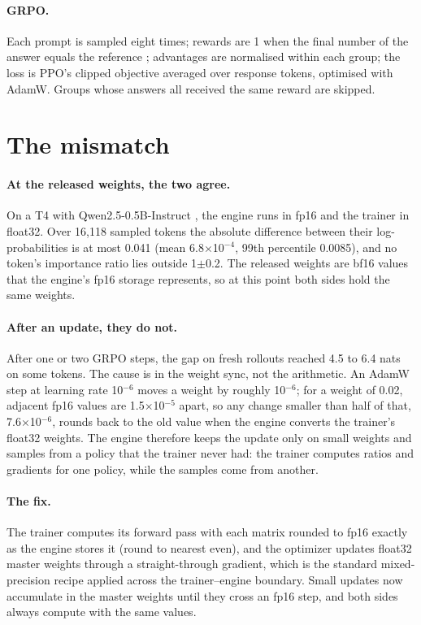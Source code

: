 \documentclass[11pt]{article}
\begin{document}
\paragraph{GRPO.} Each prompt is sampled eight times; rewards are 1 when the final number of the
answer equals the reference \citep{cobbe2021gsm8k}; advantages are normalised within each group;
the loss is PPO's clipped objective averaged over response tokens, optimised with AdamW. Groups
whose answers all received the same reward are skipped.

\section{The mismatch}
\label{sec:mismatch}

\paragraph{At the released weights, the two agree.} On a T4 with Qwen2.5-0.5B-Instruct
\citep{qwen2025qwen25}, the engine runs in fp16 and the trainer in float32. Over 16,118 sampled
tokens the absolute difference between their log-probabilities is at most 0.041 (mean
6.8$\times$10$^{-4}$, 99th percentile 0.0085), and no token's importance ratio lies outside
1$\pm$0.2. The released weights are bf16 values that the engine's fp16 storage represents, so at
this point both sides hold the same weights.

\paragraph{After an update, they do not.} After one or two GRPO steps, the gap on fresh rollouts
reached 4.5 to 6.4 nats on some tokens. The cause is in the weight sync, not the arithmetic. An
AdamW step at learning rate 10$^{-6}$ moves a weight by roughly 10$^{-6}$; for a weight of 0.02,
adjacent fp16 values are 1.5$\times$10$^{-5}$ apart, so any change smaller than half of that,
7.6$\times$10$^{-6}$, rounds back to the old value when the engine converts the trainer's float32
weights. The engine therefore keeps the update only on small weights and samples from a policy
that the trainer never had: the trainer computes ratios and gradients for one policy, while the
samples come from another.

\paragraph{The fix.} The trainer computes its forward pass with each matrix rounded to fp16 exactly
as the engine stores it (round to nearest even), and the optimizer updates float32 master weights
through a straight-through gradient, which is the standard mixed-precision recipe
\citep{micikevicius2017mixed} applied across the trainer--engine boundary. Small updates now
accumulate in the master weights until they cross an fp16 step, and both sides always compute with
the same values.
\end{document}
